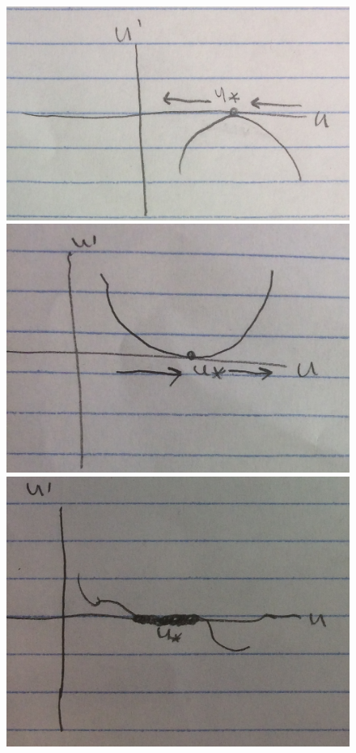 \documentclass[main.tex]{subfiles}
\begin{document}
\begin{figure}
\begin{multicols}{2}
    \includegraphics[width=\linewidth]{semistable-left}\par
    \includegraphics[width=\linewidth]{semistable-right}\par
\end{multicols}
\begin{multicols}{2}
    \includegraphics[width=\linewidth]{many-equilibria}\par

\end{multicols}
\end{figure}
\end{document}
